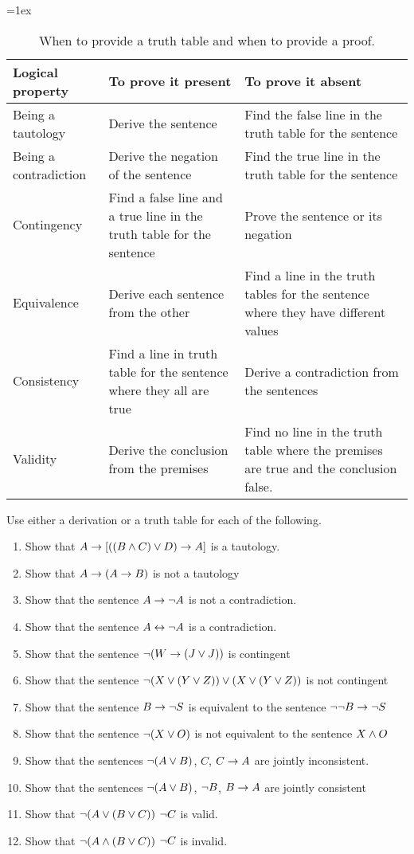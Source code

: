 \begin{table}
\tabulinesep=1ex
\begin{tabu}{X[.7,c,m] ||X[1,l,m] |X[1,l,m]}
\textbf{Logical property} 	&	\textbf{To prove it present} 	&	\textbf{To prove it absent} \\ \hline \hline
Being a tautology 		& Derive the sentence  						& Find the false line in the truth table for the sentence \\ \hline
Being a contradiction 	&  Derive the negation of the sentence  		 & Find the true line in the truth table for the sentence\\ \hline
Contingency 			& Find a false line and a true line in the truth table for the sentence & Prove the sentence or its negation\\ \hline
Equivalence 			& Derive each sentence from the other 		 & Find a line in the truth tables for the sentence where they have different values\\ \hline
Consistency 		& Find a line in truth table for the sentence where they all are true & Derive a contradiction from the sentences\\ \hline
Validity 				& Derive the conclusion from the premises & Find no line in the truth table where the premises are true and the conclusion false. \\ 
\end{tabu}
\caption{When to provide a truth table and when to provide a proof.}
\label{table.ProofOrModel}
\end{table}



\practiceproblems
\noindent\problempart Use either a derivation or a truth table for each of the following. 
\begin{enumerate}%
\item Show that $A \rightarrow [((B \wedge C) \vee D) \rightarrow A]$ is a tautology.
\item Show that $A \rightarrow (A \rightarrow B)$ is not a tautology
\item Show that the sentence $A \rightarrow \neg{A}$ is not a contradiction.
\item Show that the sentence $A \leftrightarrow \neg A$ is a contradiction. 
\item Show that the sentence $ \neg (W \rightarrow (J \vee J)) $ is contingent
\item Show that the sentence $ \neg(X \vee (Y \vee Z)) \vee (X \vee (Y \vee Z))$ is not contingent
 \item Show that the sentence $B \rightarrow \neg S$ is equivalent to the sentence $\neg \neg B \rightarrow \neg S$
\item Show that the sentence $ \neg (X \vee O) $ is not equivalent to the sentence $X \wedge O$
\item Show that the sentences $\neg(A \vee B)$, $C$, $C \rightarrow A$  are jointly inconsistent.
\item Show that the sentences $\neg(A \vee B)$, $\neg{B}$, $B \rightarrow A$ are jointly consistent
\item Show that $\neg(A \vee (B \vee C)) $ \therefore $ \neg{C}$ is valid.
\item Show that $\neg(A \wedge (B \vee C))$ \therefore $ \neg{C}$ is invalid. 
\end{enumerate}


